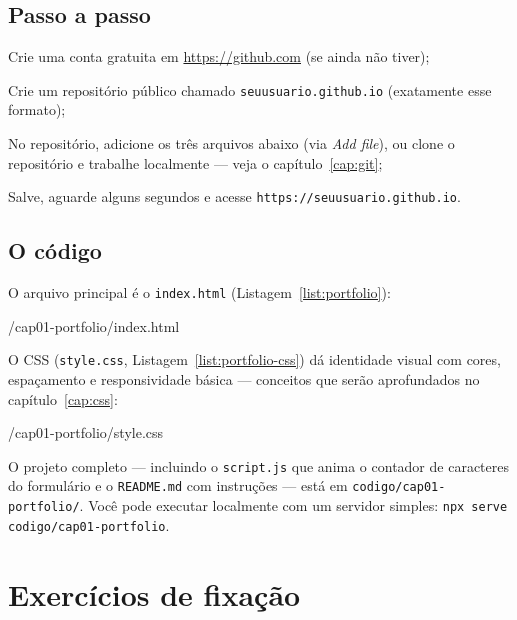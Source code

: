 \subsection{Passo a passo}

\begin{passos}
  \item Crie uma conta gratuita em \url{https://github.com} (se ainda não tiver);
  \item Crie um repositório público chamado \texttt{seuusuario.github.io}
  (exatamente esse formato);
  \item No repositório, adicione os três arquivos abaixo (via \emph{Add file}),
  ou clone o repositório e trabalhe localmente — veja o capítulo~\ref{cap:git};
  \item Salve, aguarde alguns segundos e acesse
  \texttt{https://seuusuario.github.io}.
\end{passos}

\subsection{O código}

O arquivo principal é o \texttt{index.html} (Listagem~\ref{list:portfolio}):


  {\codigopath/cap01-portfolio/index.html}

O CSS (\texttt{style.css}, Listagem~\ref{list:portfolio-css}) dá identidade
visual com cores, espaçamento e responsividade básica — conceitos que serão
aprofundados no capítulo~\ref{cap:css}:


  {\codigopath/cap01-portfolio/style.css}

\begin{caixadica}
O projeto completo — incluindo o \texttt{script.js} que anima o contador de
caracteres do formulário e o \texttt{README.md} com instruções — está em
\texttt{codigo/cap01-portfolio/}. Você pode executar localmente com um
servidor simples: \texttt{npx serve codigo/cap01-portfolio}.
\end{caixadica}

\section{Exercícios de fixação}

